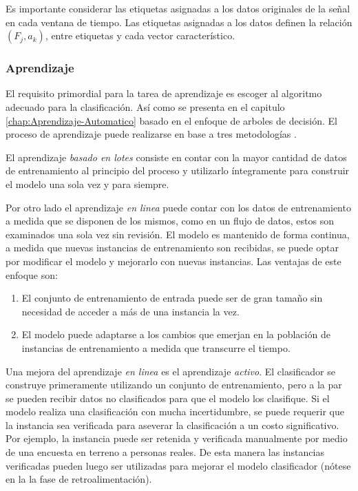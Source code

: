 Es importante considerar las etiquetas asignadas a los datos originales
de la señal en cada ventana de tiempo. Las etiquetas asignadas a los
datos definen la relación $(F_{j},a_{k})$, entre etiquetas y cada
vector característico. 

\subsubsection{Aprendizaje}

El requisito primordial para la tarea de aprendizaje es escoger al
algoritmo adecuado para la clasificación. Así como se presenta en
el capitulo \ref{chap:Aprendizaje-Automatico} basado en el enfoque
de arboles de decisión. El proceso de aprendizaje puede realizarse
en base a tres metodologías \cite{Rajaraman2011}.

El aprendizaje \emph{basado en lotes} consiste en contar con la mayor
cantidad de datos de entrenamiento al principio del proceso y utilizarlo
íntegramente para construir el modelo una sola vez y para siempre. 

Por otro lado el aprendizaje \emph{en linea} puede contar con los
datos de entrenamiento a medida que se disponen de los mismos, como
en un flujo de datos, estos son examinados una sola vez sin revisión.
El modelo es mantenido de forma continua, a medida que nuevas instancias
de entrenamiento son recibidas, se puede optar por modificar el modelo
y mejorarlo con nuevas instancias. Las ventajas de este enfoque son: 
\begin{enumerate}
\item El conjunto de entrenamiento de entrada puede ser de gran tamaño sin
necesidad de acceder a más de una instancia la vez. 
\item El modelo puede adaptarse a los cambios que emerjan en la población
de instancias de entrenamiento a medida que transcurre el tiempo.
\end{enumerate}
Una mejora del aprendizaje \emph{en linea} es el aprendizaje \emph{activo}.
El clasificador se construye primeramente utilizando un conjunto de
entrenamiento, pero a la par se pueden recibir datos no clasificados
para que el modelo los clasifique. Si el modelo realiza una clasificación
con mucha incertidumbre, se puede requerir que la instancia sea verificada
para aseverar la clasificación a un costo significativo. Por ejemplo,
la instancia puede ser retenida y verificada manualmente por medio
de una encuesta en terreno a personas reales. De esta manera las instancias
verificadas pueden luego ser utilizadas para mejorar el modelo clasificador
(nótese en la  la fase de retroalimentación). 

